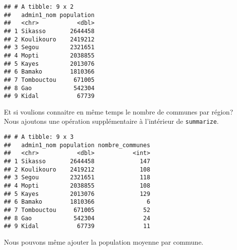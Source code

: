 \documentclass[]{book}
\newenvironment{Shaded}{\begin{snugshade}}{\end{snugshade}}
\newcommand{\KeywordTok}[1]{\textcolor[rgb]{0.13,0.29,0.53}{\textbf{#1}}}
\newcommand{\DataTypeTok}[1]{\textcolor[rgb]{0.13,0.29,0.53}{#1}}
\newcommand{\DecValTok}[1]{\textcolor[rgb]{0.00,0.00,0.81}{#1}}
\newcommand{\StringTok}[1]{\textcolor[rgb]{0.31,0.60,0.02}{#1}}
\newcommand{\CommentTok}[1]{\textcolor[rgb]{0.56,0.35,0.01}{\textit{#1}}}
\newcommand{\OperatorTok}[1]{\textcolor[rgb]{0.81,0.36,0.00}{\textbf{#1}}}
\newcommand{\NormalTok}[1]{#1}
\begin{document}
\begin{verbatim}
## # A tibble: 9 x 2
##   admin1_nom population
##   <chr>           <dbl>
## 1 Sikasso       2644458
## 2 Koulikouro    2419212
## 3 Segou         2321651
## 4 Mopti         2038855
## 5 Kayes         2013076
## 6 Bamako        1810366
## 7 Tombouctou     671005
## 8 Gao            542304
## 9 Kidal           67739
\end{verbatim}

Et si voulions connaitre en même temps le nombre de communes par région?
Nous ajoutons une opération supplémentaire à l'intérieur de
\texttt{summarize}.

\begin{Shaded}
\end{Shaded}

\begin{verbatim}
## # A tibble: 9 x 3
##   admin1_nom population nombre_communes
##   <chr>           <dbl>           <int>
## 1 Sikasso       2644458             147
## 2 Koulikouro    2419212             108
## 3 Segou         2321651             118
## 4 Mopti         2038855             108
## 5 Kayes         2013076             129
## 6 Bamako        1810366               6
## 7 Tombouctou     671005              52
## 8 Gao            542304              24
## 9 Kidal           67739              11
\end{verbatim}

Nous pouvons même ajouter la population moyenne par commune.
\end{document}
